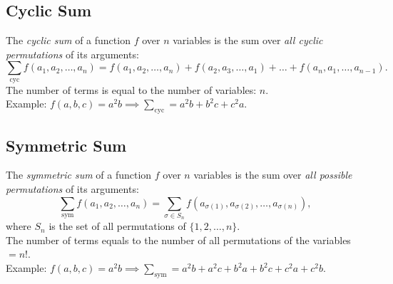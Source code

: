 \documentclass[a4paper,11pt]{article}
\begin{document}
\subsection{Cyclic Sum}
\begin{tcolorbox}[breakable]
    The \emph{cyclic sum} of a function $f$ over $n$ variables is the sum over \textit{all cyclic permutations} of its arguments:
    \[
    \sum_{\text{cyc}} f(a_1,a_2,\dots,a_n) = f(a_1,a_2,\dots,a_n) + f(a_2,a_3,\dots,a_1) + \dots +f(a_n,a_1,\dots,a_{n-1}).
    \]
    The number of terms is equal to the number of variables: $n$. \\[6pt]
    Example: $\textstyle f(a,b,c)=a^2b \implies \sum_{\text{cyc}}=a^2b+b^2c+c^2a$.
\end{tcolorbox}


\subsection{Symmetric Sum}
\begin{tcolorbox}[breakable]
    The \emph{symmetric sum} of a function $f$ over $n$ variables is the sum over \textit{all possible permutations} of its arguments:
    \[
    \sum_{\text{sym}} f(a_1,a_2,\dots,a_n) = \sum_{\sigma \in S_n} f(a_{\sigma(1)}, a_{\sigma(2)}, \dots,a_{\sigma(n)}),
    \]
    where $S_n$ is the set of all permutations of $\{1, 2, \dots, n\}$. \\[6pt]
    The number of terms equals to the number of all permutations of the variables $=n!$. \\[6pt]
    Example: $\textstyle f(a,b,c)=a^2b \implies \sum_{\text{sym}}=a^2b+a^2c+b^2a+b^2c+c^2a+c^2b$.
\end{tcolorbox}
\end{document}
